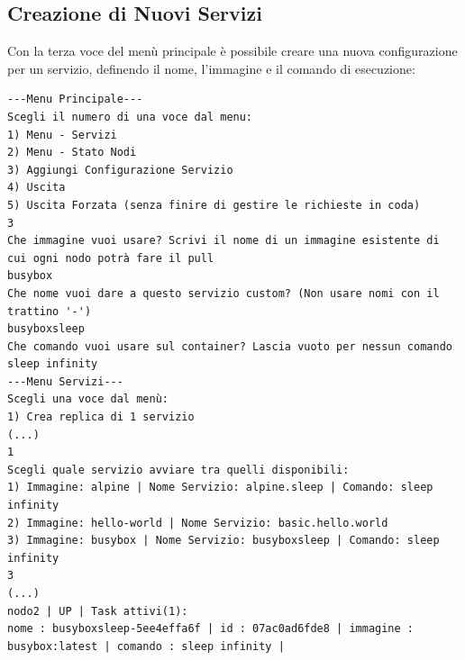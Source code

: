 \documentclass[12pt,a4paper]{article}
\begin{document}
\subsection{Creazione di Nuovi Servizi}
Con la terza voce del menù principale è possibile creare una nuova configurazione per un servizio, definendo il nome, l'immagine e il comando di esecuzione:
\begin{verbatim}
---Menu Principale---
Scegli il numero di una voce dal menu:
1) Menu - Servizi
2) Menu - Stato Nodi
3) Aggiungi Configurazione Servizio
4) Uscita
5) Uscita Forzata (senza finire di gestire le richieste in coda)
3
Che immagine vuoi usare? Scrivi il nome di un immagine esistente di cui ogni nodo potrà fare il pull
busybox
Che nome vuoi dare a questo servizio custom? (Non usare nomi con il trattino '-')
busyboxsleep
Che comando vuoi usare sul container? Lascia vuoto per nessun comando
sleep infinity
---Menu Servizi---
Scegli una voce dal menù:
1) Crea replica di 1 servizio
(...)
1
Scegli quale servizio avviare tra quelli disponibili:
1) Immagine: alpine | Nome Servizio: alpine.sleep | Comando: sleep infinity
2) Immagine: hello-world | Nome Servizio: basic.hello.world
3) Immagine: busybox | Nome Servizio: busyboxsleep | Comando: sleep infinity
3
(...)
nodo2 | UP | Task attivi(1): 
nome : busyboxsleep-5ee4effa6f | id : 07ac0ad6fde8 | immagine : busybox:latest | comando : sleep infinity | 
\end{verbatim}
\newpage
\end{document}
